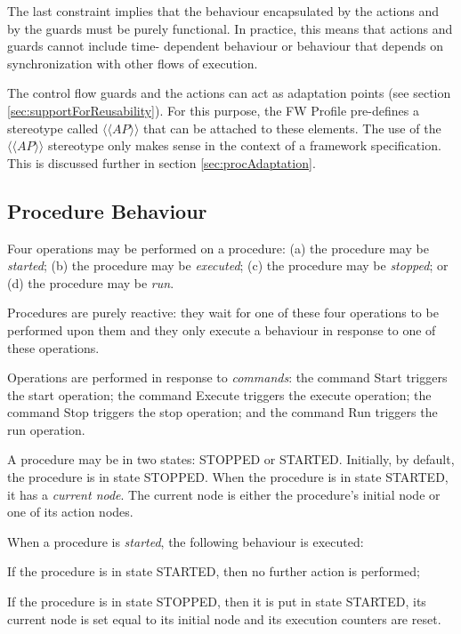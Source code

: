 \documentclass[definition]{../fwprofile}
\begin{document}
The last constraint implies that the behaviour encapsulated by the actions and by the guards
must be purely functional. In practice, this means that actions and guards cannot include time-
dependent behaviour or behaviour that depends on synchronization with other flows of
execution.

The control flow guards and the actions can act as adaptation points (see section \ref{sec:supportForReusability}). For this
purpose, the FW Profile pre-defines a stereotype called $\langle\langle AP \rangle\rangle$ that can be attached to these
elements. The use of the $\langle\langle AP \rangle\rangle$ stereotype only makes sense in the context of a framework
specification. This is discussed further in section \ref{sec:procAdaptation}.

\subsection{Procedure Behaviour}\label{sec:procBehaviour} 
Four operations may be performed on a procedure: (a) the procedure may be \emph{started}; (b) the
procedure may be \emph{executed}; (c) the procedure may be \emph{stopped}; or (d) the procedure may be
\emph{run}.

Procedures are purely reactive: they wait for one of these four operations to be performed upon
them and they only execute a behaviour in response to one of these operations.

Operations are performed in response to \emph{commands}: the command Start triggers the start
operation; the command Execute triggers the execute operation; the command Stop triggers the
stop operation; and the command Run triggers the run operation.

A procedure may be in two states: STOPPED or STARTED. Initially, by default, the procedure
is in state STOPPED. When the procedure is in state STARTED, it has a \emph{current node}. The
current node is either the procedure's initial node or one of its action nodes.

When a procedure is \emph{started}, the following behaviour is executed:
\begin{fw_enumerate} 
\item If the procedure is in state STARTED, then no further action is performed;
\item If the procedure is in state STOPPED, then it is put in state STARTED, its current
node is set equal to its initial node and its execution counters are reset.
\end{fw_enumerate}
\end{document}
